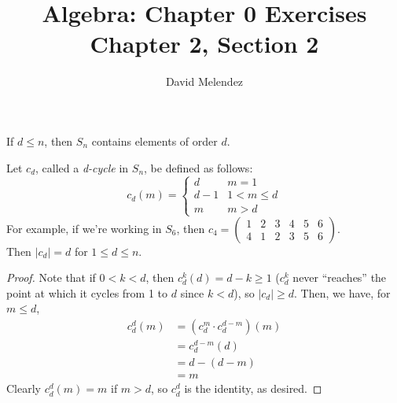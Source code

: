 \documentclass[12pt]{article}
\newenvironment{problem}[2][Problem]{\begin{trivlist}
\item[\hskip \labelsep {\bfseries #1}\hskip \labelsep {\bfseries #2.}]}{\end{trivlist}}
\newenvironment{proposition}[1][Proposition]{\begin{trivlist}
\item[\hskip \labelsep {\bfseries #1.}]}{\end{trivlist}}
\begin{document}
\title{Algebra: Chapter 0 Exercises\\ \large Chapter 2, Section 2}
\author{David Melendez}
\maketitle

\begin{problem}{2.2}
  If $d\leq n$, then $S_n$ contains elements of order $d$.
\end{problem}
\begin{proposition}
  Let $c_d$, called a \textit{d-cycle} in $S_n$, be defined as follows:
  \begin{equation*}
    c_d(m) = 
    \begin{cases}
      d   & m = 1 \\
      d-1 & 1 < m \leq d \\
      m   & m > d
    \end{cases}
  \end{equation*}
  For example, if we're working in $S_6$, then 
  $c_4 = \begin{pmatrix} 1&2&3&4&5&6 \\ 4&1&2&3&5&6 \end{pmatrix}$. \\
  Then $|c_d| = d$ for $1 \leq d \leq n$.
\end{proposition}
\begin{proof}
  Note that if $0 < k < d$, then 
  $c_d^k(d) = d-k \geq 1$ 
  ($c_d^k$ never ``reaches'' the point at which it cycles from 1 to $d$ since $k<d$), 
  so $|c_d| \geq d$. Then, we have, for $m\leq d$,
  \begin{align*}
    c_d^d(m) &= (c_d^m \cdot c_d^{d-m})(m)\\
    &= c_d^{d-m}(d) \\
    &= d - (d - m) \\
    &= m
  \end{align*}
  Clearly $c_d^d(m) = m$ if $m>d$, so $c_d^d$ is the identity, as desired.
\end{proof}
\end{document}
